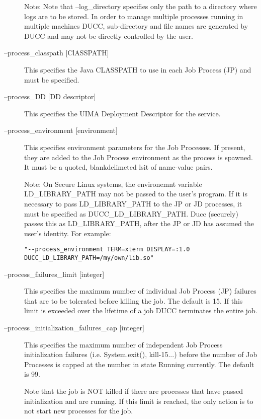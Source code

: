 \begin{description}
        Note: Note that --log\_directory specifies only the path to a directory where 
        logs are to be stored. In order to manage multiple processes running in multiple 
        machines DUCC, sub-directory and file names are generated by DUCC and may 
        not be directly controlled by the user.

      \item[--process\_classpath {[ClASSPATH]}] 
        This specifies the Java CLASSPATH to use in each Job Process (JP) and must be 
        specified.

      \item[--process\_DD {[DD descriptor]}] 
        This specifies the UIMA Deployment Descriptor for the service.

      \item[--process\_environment {[environment]}] This specifies environment parameters for the Job
        Processes. If present, they are added to the Job Process environment as the process is
        spawned. It must be a quoted, blankdelimeted lsit of name-value pairs.

        Note: On Secure Linux systems, the environemnt variable 
        LD\_LIBRARY\_PATH may not be passed to the user's program. If it is 
        necessary to pass LD\_LIBRARY\_PATH to the JP or JD processes, it must be 
        specified as DUCC\_LD\_LIBRARY\_PATH. Ducc (securely) passes this as 
        LD\_LIBRARY\_PATH, after the JP or JD has assumed the user's identity. For 
        example: 
\begin{verbatim}
"--process_environment TERM=xterm DISPLAY=:1.0 DUCC_LD_LIBRARY_PATH=/my/own/lib.so" 
\end{verbatim}
        
      \item[--process\_failures\_limit {[integer]}] 
        This specifies the maximum number of individual Job Process (JP) failures that are to be 
        tolerated before killing the job. The default is 15. If this limit is exceeded over the lifetime 
        of a job DUCC terminates the entire job. 

      \item[--process\_initialization\_failures\_cap {[integer]}] 
        This specifies the maximum number of independent Job Process initialization failures (i.e. 
        System.exit(), kill-15...) before the number of Job Processes is capped at the number in 
        state Running currently. The default is 99.

        Note that the job is NOT killed if there are processes that have passed initialization and are 
        running. If this limit is reached, the only action is to not start new processes for the job. 


\end{description}
